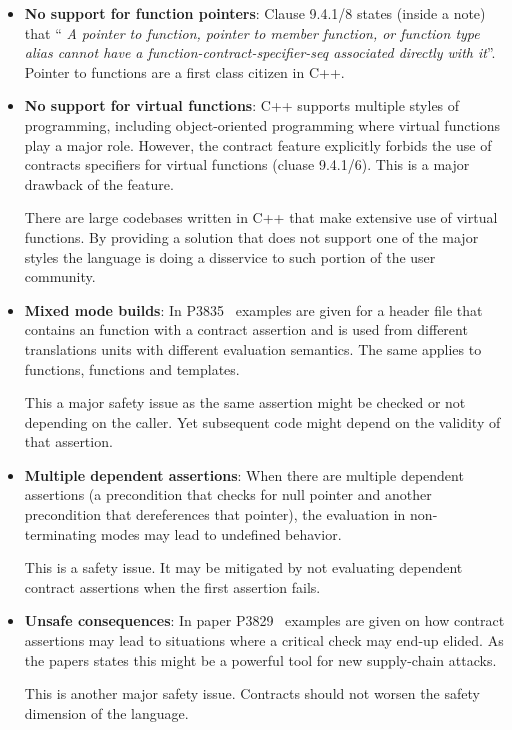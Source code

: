 \begin{itemize}
\item \textbf{No support for function pointers}: Clause 9.4.1/8 states (inside a
note) that ``\emph{ A pointer to function, pointer to member function, or function
type alias cannot have a function-contract-specifier-seq associated directly
with it}''. Pointer to functions are a first class citizen in C++.

\item \textbf{No support for virtual functions}: C++ supports multiple styles of
programming, including object-oriented programming where virtual functions play
a major role. However, the contract feature explicitly forbids the use of
contracts specifiers for virtual functions (cluase 9.4.1/6). This is a major
drawback of the feature.

There are large codebases written in C++ that make extensive use of virtual
functions. By providing a solution that does not support one of the major styles
the language is doing a disservice to such portion of the user community.


\item \textbf{Mixed mode builds}: In P3835~\cite{p3835r0} examples are given for
a header file that contains an  function with a contract assertion and is
used from different translations units with different evaluation semantics. The
same applies to  functions,  functions and
templates.

This a major safety issue as the same assertion might be checked or not
depending on the caller. Yet subsequent code might depend on the validity of
that assertion.

\item \textbf{Multiple dependent assertions}: When there are multiple dependent
assertions (a precondition that checks for null pointer and another precondition
that dereferences that pointer), the evaluation in non-terminating modes may
lead to undefined behavior.

This is a safety issue. It may be mitigated by not evaluating dependent contract
assertions when the first assertion fails.

\item \textbf{Unsafe consequences}: In paper P3829~\cite{p3829r0} examples are
given on how contract assertions may lead to situations where a critical check
may end-up elided. As the papers states this might be a powerful tool for new
supply-chain attacks.

This is another major safety issue. Contracts should not worsen the safety
dimension of the language.


\end{itemize}
